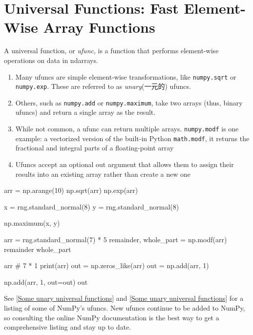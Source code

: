 \section{Universal Functions: Fast Element-Wise Array Functions}
A universal function, or \emph{ufunc}, is a function that performs element-wise operations
on data in ndarrays.
\begin{enumerate}
    \item Many ufuncs are simple element-wise transformations, like \verb|numpy.sqrt| or \verb|numpy.exp|. These are referred to as \emph{unary}(一元的) ufuncs.
    \item Others, such as \verb|numpy.add| or \verb|numpy.maximum|, take two arrays (thus, binary ufuncs) and return a single array as the result.
    \item While not common, a ufunc can return multiple arrays. \verb|numpy.modf| is one example: a vectorized version of the built-in Python \verb|math.modf|, it returns the fractional and integral parts of a floating-point array
    \item Ufuncs accept an optional out argument that allows them to assign their results into an existing array rather than create a new one
\end{enumerate}
\begin{pyc}
arr = np.arange(10)
np.sqrt(arr)
np.exp(arr)

x = rng.standard_normal(8)
y = rng.standard_normal(8)

np.maximum(x, y)

arr = rng.standard_normal(7) * 5
remainder, whole_part = np.modf(arr)
remainder
whole_part

arr
# 7 * 1
print(arr)
out = np.zeros_like(arr)
out = np.add(arr, 1)

np.add(arr, 1, out=out)
out
\end{pyc}

See \autoref{Some unary universal functions} and \autoref{Some unary universal functions} for a listing of some of NumPy’s ufuncs. New ufuncs continue to be added to NumPy, so consulting the online NumPy documentation is the best way to get a comprehensive listing and stay up to date.

